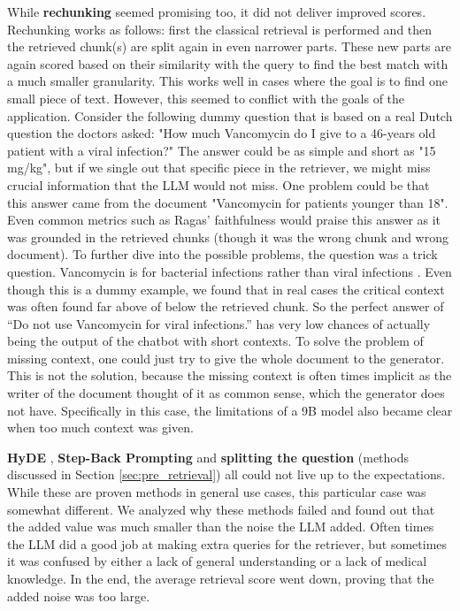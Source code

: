 While \textbf{rechunking} seemed promising too, it did not deliver improved scores. Rechunking works as follows: first the classical retrieval is performed and then the retrieved chunk(s) are split again in even narrower parts. These new parts are again scored based on their similarity with the query to find the best match with a much smaller granularity. This works well in cases where the goal is to find one small piece of text. However, this seemed to conflict with the goals of the application. Consider the following dummy question that is based on a real Dutch question the doctors asked: "How much Vancomycin do I give to a 46-years old patient with a viral infection?" The answer could be as simple and short as "15 mg/kg", but if we single out that specific piece in the retriever, we might miss crucial information that the LLM would not miss. One problem could be that this answer came from the document "Vancomycin for patients younger than 18". Even common metrics such as Ragas' \cite{es2024ragas} faithfulness would praise this answer as it was grounded in the retrieved chunks (though it was the wrong chunk and wrong document). To further dive into the possible problems, the question was a trick question. Vancomycin is for bacterial infections rather than viral infections \cite{vancomycin_wikipedia}. Even though this is a dummy example, we found that in real cases the critical context was often found far above of below the retrieved chunk. So the perfect answer of ``Do not use Vancomycin for viral infections.'' has very low chances of actually being the output of the chatbot with short contexts. To solve the problem of missing context, one could just try to give the whole document to the generator. This is not the solution, because the missing context is often times implicit as the writer of the document thought of it as common sense, which the generator does not have. Specifically in this case, the limitations of a 9B model also became clear when too much context was given.

\textbf{HyDE} \cite{gao2023precisehyde}, \textbf{Step-Back Prompting} \cite{zheng2023takeastepback} and \textbf{splitting the question} (methods discussed in Section \ref{sec:pre_retrieval}) all could not live up to the expectations. While these are proven methods in general use cases, this particular case was somewhat different. We analyzed why these methods failed and found out that the added value was much smaller than the noise the LLM added. Often times the LLM did a good job at making extra queries for the retriever, but sometimes it was confused by either a lack of general understanding or a lack of medical knowledge. In the end, the average retrieval score went down, proving that the added noise was too large.

